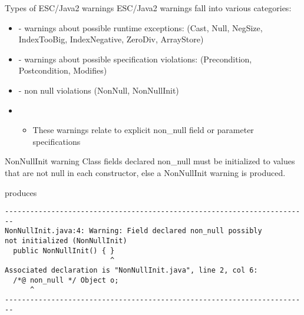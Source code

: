 \documentclass[
pdf,
nocolorBG,
slideColor,
cok,
]{prosper}
\begin{document}
\begin{slide}{Types of ESC/Java2 warnings}
\vspace*{-6ex}
ESC/Java2 warnings fall into various categories:
\begin{itemize}
\item[] - {\gray warnings about possible { runtime exceptions}:
(Cast, Null, NegSize, IndexTooBig, IndexNegative, ZeroDiv, ArrayStore)}

\item[] - {\gray warnings about possible { specification violations}:
(Precondition, Postcondition, Modifies)}

\item[] - {\knalblue non null} violations (NonNull, NonNullInit)

\item[]
\begin{itemize}
\item These warnings relate to explicit {\blue non\_null} field or parameter specifications
\end{itemize}

\end{itemize}
\end{slide}
\begin{slide}{NonNullInit warning}
\vspace*{-6ex}
Class fields declared {\knalblue non\_null} must be initialized to values that are not null in each constructor, else a NonNullInit warning is produced.
\begin{figure*}
\tiny

\end{figure*}
produces
\tiny
\begin{verbatim}
------------------------------------------------------------------------
NonNullInit.java:4: Warning: Field declared non_null possibly 
not initialized (NonNullInit)
  public NonNullInit() { }
                         ^
Associated declaration is "NonNullInit.java", line 2, col 6:
  /*@ non_null */ Object o;
      ^
------------------------------------------------------------------------
\end{verbatim}
\end{slide}
\end{document}
